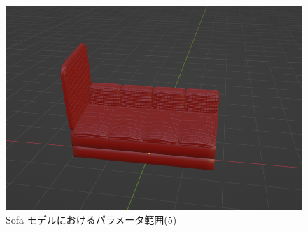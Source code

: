 \begin{figure}[h]
\begin{minipage}[b]{0.48\linewidth}
  \includegraphics[scale=0.17]{./imgs/sofaParamMean/sideCushionHeightMax.png}
 \end{minipage}
 \caption{Sofa モデルにおけるパラメータ範囲(5)}\label{fig:sofaParamMean_5}
\end{figure}



